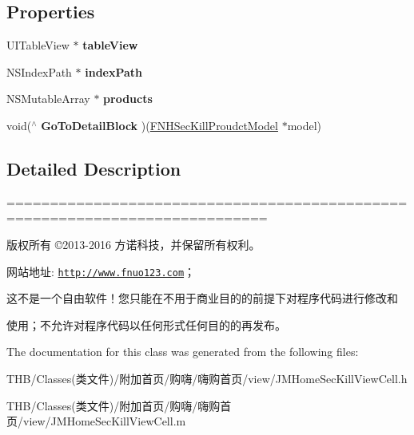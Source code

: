 \subsection*{Properties}
\begin{DoxyCompactItemize}
\item 
\mbox{\label{interface_j_m_home_sec_kill_view_cell_a701c8c67c7c484560fee6616f49e8392}} 
U\+I\+Table\+View $\ast$ {\bfseries table\+View}
\item 
\mbox{\label{interface_j_m_home_sec_kill_view_cell_aa7615bf7b4d4ed95812eb4a04bb18233}} 
N\+S\+Index\+Path $\ast$ {\bfseries index\+Path}
\item 
\mbox{\label{interface_j_m_home_sec_kill_view_cell_af9e7dc117db5b0303c9dd514d5e3a47b}} 
N\+S\+Mutable\+Array $\ast$ {\bfseries products}
\item 
\mbox{\label{interface_j_m_home_sec_kill_view_cell_a926984d2c6654d87c5615d4ead8d4419}} 
void($^\wedge$ {\bfseries Go\+To\+Detail\+Block} )(\mbox{\hyperlink{interface_f_n_h_sec_kill_proudct_model}{F\+N\+H\+Sec\+Kill\+Proudct\+Model}} $\ast$model)
\end{DoxyCompactItemize}


\subsection{Detailed Description}
============================================================================

版权所有 ©2013-\/2016 方诺科技，并保留所有权利。

网站地址\+: \href{http://www.fnuo123.com}{\tt http\+://www.\+fnuo123.\+com}； 



这不是一个自由软件！您只能在不用于商业目的的前提下对程序代码进行修改和

使用；不允许对程序代码以任何形式任何目的的再发布。 

 

The documentation for this class was generated from the following files\+:\begin{DoxyCompactItemize}
\item 
T\+H\+B/\+Classes(类文件)/附加首页/购嗨/嗨购首页/view/J\+M\+Home\+Sec\+Kill\+View\+Cell.\+h\item 
T\+H\+B/\+Classes(类文件)/附加首页/购嗨/嗨购首页/view/J\+M\+Home\+Sec\+Kill\+View\+Cell.\+m\end{DoxyCompactItemize}
